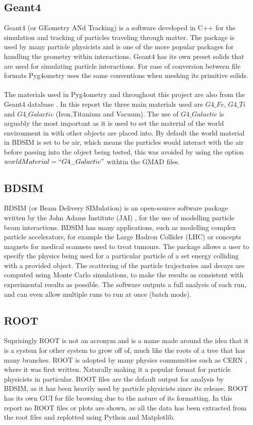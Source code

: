 \documentclass[12pt,a4paper]{article}
\begin{document}
\subsection{Geant4}\label{geant4}
\label{g4}
Geant4 (or GEometry ANd Tracking) is a software developed in C++ for the simulation and tracking of particles traveling through matter. The package is used by many particle physicists and is one of the more popular packages for handling the geometry within interactions. Geant4 has its own preset solids that are used for simulating particle interactions. For ease of conversion between file formats Pyg4ometry uses the same conventions when meshing its primitive solids.
\\\\
The materials used in Pyg4ometry and throughout this project are also from the Geant4 database \cite{mater}. In this report the three main materials used are $G4\_Fe$, $G4\_Ti$ and $G4\_Galactic$ (Iron,Titanium and Vacuum). The use of $G4\_Galactic$ is arguably the most important as it is used to set the material of the world environment in with other objects are placed into. By default the world material in BDSIM is set to be air, which means the particles would interact with the air before passing into the object being tested, this was avoided by using the option $worldMaterial=``G4\_Galactic"$ withtin the GMAD files.

\subsection{BDSIM}
\label{bdsim}
BDSIM (or Beam Delivery SIMulation) is an open-source software package written by the John Adams Institute (JAI) \cite{jai}, for the use of modelling particle beam interactions. BDSIM has many applications, such as modelling complex particle accelerators, for example the Large Hadron Collider (LHC) or concepts magnets for medical scanners used to treat tumours. The package allows a user to specify the physics being used for a particular particle of a set energy colliding with a provided object. The scattering of the particle trajectories and decays are computed using Monte Carlo simulations, to make the results as consistent with experimental results as possible. The software outputs a full analysis of each run, and can even allow multiple runs to run at once (batch mode).

\subsection{ROOT}\label{root}
Suprisingly ROOT is not an acronym and is a name made around the idea that it is a system for other system to grow off of, much like the roots of a tree that has many branches. ROOT is adopted by many physics communities such as CERN \cite{cern}, where it was first written. Naturally making it a popular format for particle physicists in particular. ROOT files are the default output for analysis by BDSIM, as it has been heavily used by particle physicists since its release. ROOT has its own GUI for file browsing due to the nature of its formatting. In this report no ROOT files or plots are shown, as all the data has been extracted from the root files and replotted using Python and Matplotlib.
\end{document}

